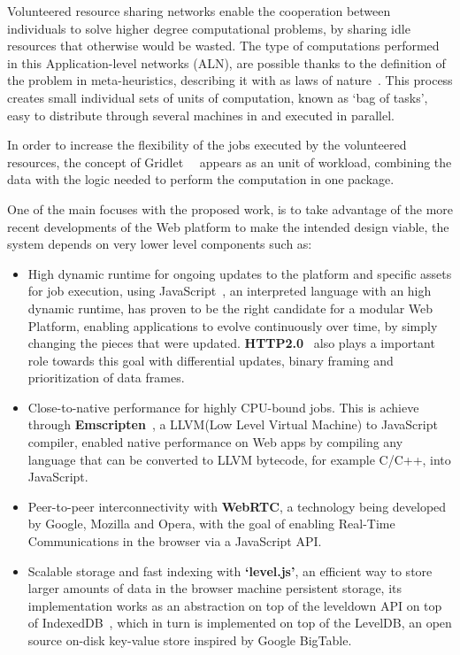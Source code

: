 Volunteered resource sharing networks enable the cooperation between individuals to solve higher degree computational problems, by sharing idle resources that otherwise would be wasted. The type of computations performed in this Application-level networks (ALN), are possible thanks to the definition of the problem in meta-heuristics, describing it with as laws of nature~\cite{Duda2013}. This process creates small individual sets of units of computation, known as `bag of tasks', easy to distribute through several machines in and executed in parallel.

In order to increase the flexibility of the jobs executed by the volunteered resources, the concept of Gridlet~\cite{Costa2012}~\cite{Rodrigues} appears as an unit of workload, combining the data with the logic needed to perform the computation in one package.

One of the main focuses with the proposed work, is to take advantage of the more recent developments of the Web platform to make the intended design viable, the system depends on very lower level components such as:
\begin{itemize}
  \item High dynamic runtime for ongoing updates to the platform and specific assets for job execution, using JavaScript~\cite{Ecma2009}, an interpreted language with an high dynamic runtime, has proven to be the right candidate for a modular Web Platform, enabling applications to evolve continuously over time, by simply changing the pieces that were updated. \textbf{HTTP2.0}~\cite{Thomson2013} also plays a important role towards this goal with differential updates, binary framing and prioritization of data frames.
  \item Close-to-native performance for highly CPU-bound jobs. This is achieve through \textbf{Emscripten}~\cite{Zakai2011}, a LLVM(Low Level Virtual Machine) to JavaScript compiler, enabled native performance on Web apps by compiling any language that can be converted to LLVM bytecode, for example C/C++, into JavaScript.
  \item Peer-to-peer interconnectivity with \textbf{WebRTC}\cite{IanHickson2013}, a technology being developed by Google, Mozilla and Opera, with the goal of enabling Real-Time Communications in the browser via a JavaScript API.
  \item Scalable storage and fast indexing with \textbf{`level.js'}, an efficient way to store larger amounts of data in the browser machine persistent storage, its implementation works as an abstraction on top of the leveldown API on top of IndexedDB~\cite{Recommendation2013}, which in turn is implemented on top of the LevelDB, an open source on-disk key-value store inspired by Google BigTable.
\end{itemize}

